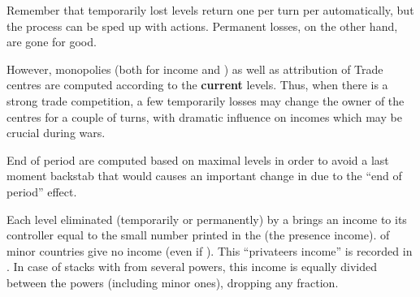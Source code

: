 \begin{designnote}
  Remember that temporarily lost levels return one per turn per \TradeFLEET
  automatically, but the process can be sped up with \TFI actions. Permanent
  losses, on the other hand, are gone for good.

  However, monopolies (both for income and \VPs) as well as attribution of
  Trade centres are computed according to the \textbf{current} levels. Thus,
  when there is a strong trade competition, a few temporarily losses may
  change the owner of the centres for a couple of turns, with dramatic
  influence on incomes which may be crucial during wars.

  End of period \VPs are computed based on maximal levels in order to avoid a
  last moment backstab that would causes an important change in \VPs due to
  the ``end of period'' effect.
\end{designnote}

 Each level eliminated (temporarily or
permanently) by a \corsaire brings an income to its controller equal to the
small number printed in the \STZ (the presence income). \corsaire of minor
countries give no income (even if \VASSAL).
\bparag This ``privateers income'' is recorded in .
\bparag In case of stacks with \corsaire from several powers, this income is
equally divided between the powers (including minor ones), dropping any
fraction.

